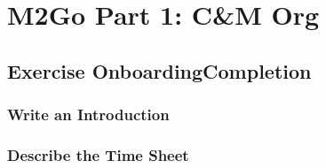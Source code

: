 \chapter{M2Go Part 1: C\&M Org}
\label{cha:cm_org}

\section{Exercise OnboardingCompletion}

\subsection{Write an Introduction}

\subsection{Describe the Time Sheet}



